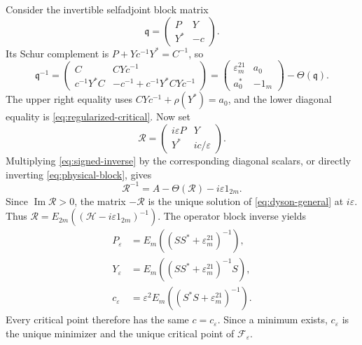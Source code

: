 Consider the invertible selfadjoint block matrix
\[
 \mathfrak q=\begin{pmatrix}P&Y\\Y^*&-c\end{pmatrix}.
\]
Its Schur complement is $P+Yc^{-1}Y^*=C^{-1}$, so
\begin{equation}\label{eq:signed-inverse}
 \mathfrak q^{-1}=
 \begin{pmatrix}
 C&CYc^{-1}\\
 c^{-1}Y^*C&-c^{-1}+c^{-1}Y^*CYc^{-1}
 \end{pmatrix}
 =\begin{pmatrix}\varepsilon^21_m&a_0\\a_0^*&-1_m\end{pmatrix}
       -\Theta(\mathfrak q).
\end{equation}
The upper right equality uses $CYc^{-1}+\rho(Y^*)=a_0$, and the lower diagonal equality is \eqref{eq:regularized-critical}.
Now set
\begin{equation}\label{eq:physical-block}
 \mathscr R=\begin{pmatrix}i\varepsilon P&Y\\Y^*&ic/\varepsilon\end{pmatrix}.
\end{equation}
Multiplying \eqref{eq:signed-inverse} by the corresponding diagonal scalars, or directly inverting \eqref{eq:physical-block}, gives
\[
 \mathscr R^{-1}=A-\Theta(\mathscr R)-i\varepsilon 1_{2m}.
\]
Since $\operatorname{Im}\mathscr R>0$, the matrix $-\mathscr R$ is the unique solution of \eqref{eq:dyson-general} at $i\varepsilon$.
Thus $\mathscr R=E_{2m}((\mathscr H-i\varepsilon 1_{2m})^{-1})$.
The operator block inverse yields
\begin{equation}\label{eq:regularized-optimizer}
 \begin{split}
 P_\varepsilon&=E_m((SS^*+\varepsilon^21_m)^{-1}),\\
 Y_\varepsilon&=E_m((SS^*+\varepsilon^21_m)^{-1}S),\\
 c_\varepsilon&=\varepsilon^2E_m((S^*S+\varepsilon^21_m)^{-1}).
 \end{split}
\end{equation}
Every critical point therefore has the same $c=c_\varepsilon$.
Since a minimum exists, $c_\varepsilon$ is the unique minimizer and the unique critical point of $\mathcal F_\varepsilon$.

